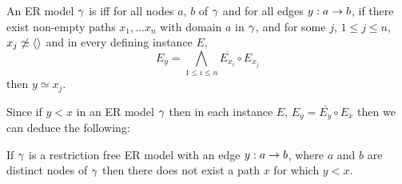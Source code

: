 \begin{definition}
An ER model $\gamma$ is  iff for all  nodes $a$, $b$ of $\gamma$ and for all edges $y: a \rightarrow b$, if there exist non-empty paths $x_1,...x_n$   with domain $a$ in $\gamma$,  and for some $j$, $1 \leq j \leq n$, $x_j \not\simeq \langle\rangle$ and in every defining instance $E$,  
$$E_y = \bigwedge_{1 \leq i \leq n}{\overline{E_{x_i}}} \circ E_{x_j}$$
then $y \simeq x_j$.  
\end{definition}

Since if $y < x$ in an ER model $\gamma$ then in each instance $E$, $E_y = \bar{E_y} \circ E_x$
then we can deduce the following:
\begin{observation}
If $\gamma$ is a restriction free  ER model with an edge $y:a \rightarrow b$, where  $a$ and $b$ are distinct nodes of $\gamma$ then there does not exist a path  $x$ for which $y < x$.
\end{observation}

